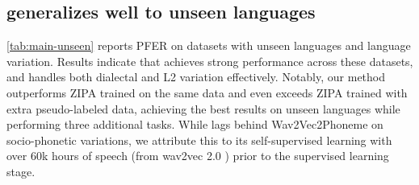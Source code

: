 \subsection{\POWSM generalizes well to unseen languages} %
\autoref{tab:main-unseen} reports PFER on datasets with unseen languages and language variation.
Results indicate that \POWSM achieves strong performance across these datasets, and handles both dialectal and L2 variation effectively.
Notably, our method outperforms ZIPA trained on the same data and even exceeds ZIPA trained with extra pseudo-labeled data, achieving the best results on unseen languages while performing three additional tasks.
While \POWSM lags behind Wav2Vec2Phoneme on socio-phonetic variations, we attribute this to its self-supervised learning with over 60k hours of speech (from wav2vec 2.0 \citep{baevski2020wav2vec}) prior to the supervised learning stage.

\begin{table}[t]
\vspace{-2mm}
\centering
{}
\caption{PFER ($\downarrow$) on out-of-domain data. ``DRC-SE'' stands for DoReCo South-England; ``L2-ARC'' stands for L2-ARCTIC; ``SO762'' stands for SpeechOcean762. Unseen language datasets include languages not supported by Allophant; therefore, we do not report results for these datasets.}
\label{tab:main-unseen}
\end{table}

